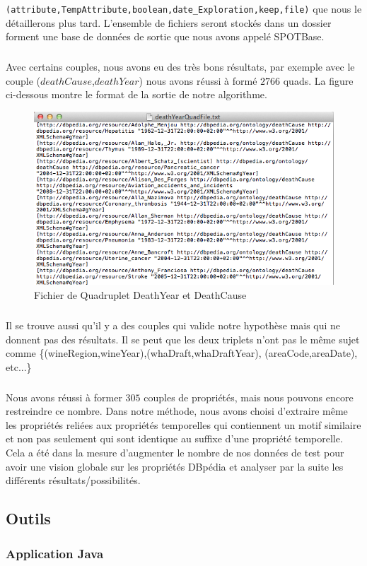 \documentclass[12pt,a4	]{report}
\begin{document}
\newline
{\tt (attribute,TempAttribute,boolean,date\_Exploration,keep,file)} que nous le détaillerons plus tard. L'ensemble de fichiers seront stockés dans un dossier forment une base de données de sortie que nous avons appelé SPOTBase.
\subparagraph{}
Avec certains couples, nous avons eu des très bons résultats, par exemple avec le couple ($deathCause$,$deathYear$) nous avons réussi à formé $2766$ quads. La figure ci-dessous montre le format de la sortie de notre algorithme.
 \begin{figure}[H]
        \centering
                \includegraphics[width=13cm]{DeathYearCause.png}
               \caption{Fichier de Quadruplet DeathYear et DeathCause}
\end{figure}
\subparagraph{}
Il se trouve aussi qu'il y a des couples qui valide notre hypothèse mais qui ne donnent pas des résultats. Il se peut que les deux triplets n'ont pas le même sujet comme \{(wineRegion,wineYear),(whaDraft,whaDraftYear),
(areaCode,areaDate), etc...\}
\subparagraph{}
Nous avons réussi à former $305$ couples de propriétés, mais nous pouvons encore restreindre ce nombre. Dans notre méthode, nous avons choisi d'extraire même les propriétés reliées aux propriétés temporelles qui contiennent un motif similaire et non pas seulement qui sont identique au suffixe d'une propriété temporelle. Cela a été dans la mesure d'augmenter le nombre de nos données de test pour avoir une vision globale sur les propriétés DBpédia et analyser par la suite les différents résultats/possibilités. 
\subsection*{Outils}
\subsubsection*{Application Java}
\end{document}

